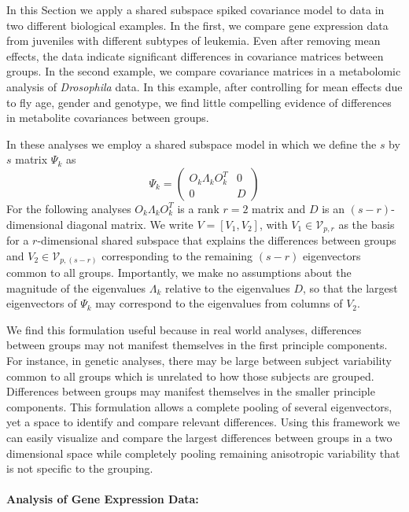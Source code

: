 \documentclass[12pt]{article}
\begin{document}
In this Section we apply a shared subspace spiked covariance model to data in two
different biological examples.  In the first, we compare gene
expression data from juveniles with different subtypes of leukemia.  Even
after removing mean effects, the data indicate significant differences
in covariance matrices between groups.  In the second example, we
compare covariance matrices in a metabolomic analysis of \textit{Drosophila} data.  In
this example, after controlling for mean effects due to fly age, gender and
genotype, we find little compelling evidence of differences in metabolite
covariances between groups. 

In these analyses we employ a shared subspace model in
which we define the $s$ by $s$ matrix $\Psi_k$ as
%
\begin{equation}
\Psi_k =\left( \begin{array}{cc}
O_k\Lambda_kO_k^T & 0  \\
0 & D  \end{array} \right)
\end{equation}
%
For the following analyses $O_k\Lambda_kO_k^T$ is a rank $r=2$ matrix
and $D$ is an $(s-r)$-dimensional diagonal matrix.  We write
$V = [V_1, V_2]$, with $V_1 \in \mathcal{V}_{p,r}$ as the basis for a
$r$-dimensional shared subspace that explains the differences between
groups and $V_2 \in \mathcal{V}_{p,(s-r)}$ corresponding to the remaining $(s-r)$
eigenvectors common to all groups.  Importantly, we make no assumptions about the
magnitude of the eigenvalues $\Lambda_k$ relative to the eigenvalues
$D$, so that the largest eigenvectors of $\Psi_k$ may correspond to
the eigenvalues from columns of $V_2$.  

We find this formulation useful because in real world analyses,
differences between groups may not manifest themselves in the first
principle components.  For instance, in genetic analyses, there may be
large between subject variability common to all groups which is
unrelated to how those subjects are grouped. Differences between
groups may manifest themselves in the smaller principle
components. This formulation allows a complete pooling of several
eigenvectors, yet a space to identify and compare relevant
differences.  Using this framework we can easily visualize and compare the
largest differences between groups in a two dimensional space while
completely pooling remaining anisotropic variability that is not
specific to the grouping.

\paragraph{Analysis of Gene Expression Data:}
\end{document}

